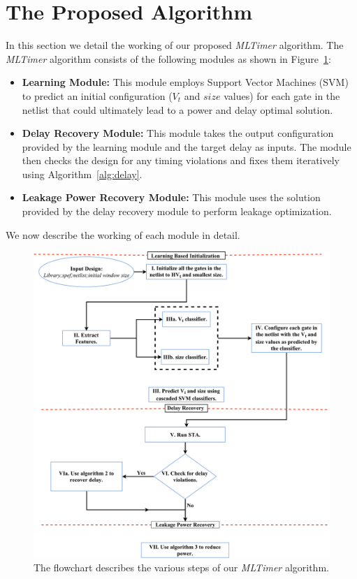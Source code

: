 \section{The Proposed Algorithm}
\label{sec:proposed}
In this section we detail the working of our proposed \textit{MLTimer} algorithm. The \textit{MLTimer} algorithm consists of the following modules as shown in Figure~\ref{fig:algo}:
\begin{itemize}
    \item \textbf{Learning Module:} This module employs Support Vector Machines (SVM) to predict an initial configuration ($V_t$ and $size$ values) for each gate in the netlist that could ultimately lead to a power and delay optimal solution.
    \item \textbf{Delay Recovery Module:} This module takes the output configuration provided by the learning module and the target delay as inputs. The module then checks the design for any timing violations and fixes them iteratively using Algorithm~\ref{alg:delay}.
    \item \textbf{Leakage Power Recovery Module:} This module uses the solution provided by the delay recovery module to perform leakage optimization.
\end{itemize}

\noindent We now describe the working of each module in detail.

\begin{figure}[!t]
\begin{center}
\includegraphics[scale=0.35]{Chapter3/fig/learntimer.pdf}
\caption{The flowchart describes the various steps of our \textit{MLTimer} algorithm.}
\label{fig:algo}
\end{center}
\end{figure}


